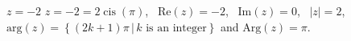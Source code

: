 { $z = -2$ }
{ $z =  -2 = 2\operatorname{cis}\left(\pi\right)$, \, $\text{Re}(z) = -2$, \, $\text{Im}(z) =0$, \, $|z| = 2$, \, $\text{arg}(z) = \left\{(2k+1)\pi \, | \, \text{$k$ is an integer} \right\}$ and $\text{Arg}(z) = \pi$.}
